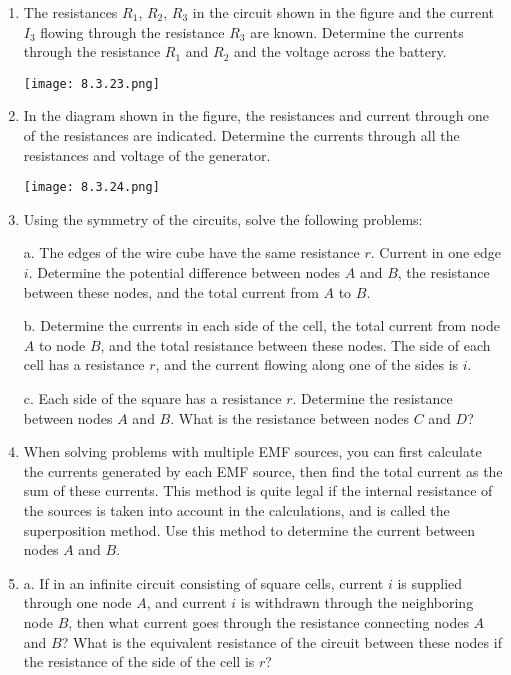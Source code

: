 \documentclass{article}
\begin{document}
\begin{enumerate}[label=8.3.\arabic*]
\item The resistances $R_1$, $R_2$, $R_3$ in the circuit shown in the figure and the current $I_3$ flowing through the resistance $R_3$ are known. Determine the currents through the resistance $R_1$ and $R_2$ and the voltage across the battery.

\begin{center}
    \texttt{[image: 8.3.23.png]}
\end{center}


\item In the diagram shown in the figure, the resistances and current through one of the resistances are indicated. Determine the currents through all the resistances and voltage of the generator.

\begin{center}
    \texttt{[image: 8.3.24.png]}
\end{center}


\item Using the symmetry of the circuits, solve the following problems: 

a. The edges of the wire cube have the same resistance $r$. Current in one edge $i$. Determine the potential difference between nodes $A$ and $B$, the resistance between these nodes, and the total current from $A$ to $B$.

b. Determine the currents in each side of the cell, the total current from node $A$ to node $B$, and the total resistance between these nodes. The side of each cell has a resistance $r$, and the current flowing along one of the sides is $i$. 

c. Each side of the square has a resistance $r$. Determine the resistance between nodes $A$ and $B$. What is the resistance between nodes $C$ and $D$?

\item When solving problems with multiple EMF sources, you can first calculate the currents generated by each EMF source, then find the total current as the sum of these currents. This method is quite legal if the internal resistance of the sources is taken into account in the calculations, and is called the superposition method. Use this method to determine the current between nodes $A$ and $B$.

\item a. If in an infinite circuit consisting of square cells, current $i$ is supplied through one node $A$, and current $i$ is withdrawn through the neighboring node $B$, then what current goes through the resistance connecting nodes $A$ and $B$? What is the equivalent resistance of the circuit between these nodes if the resistance of the side of the cell is $r$?


\end{enumerate}
\end{document}
